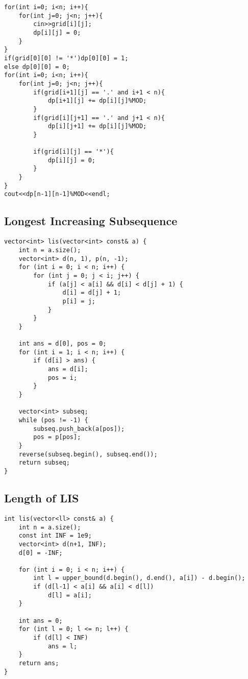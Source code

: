\documentclass[10pt]{article}
\begin{document}
\begin{multicols*}{2}
\begin{lstlisting}[style=compactcpp]
for(int i=0; i<n; i++){
    for(int j=0; j<n; j++){
        cin>>grid[i][j];
        dp[i][j] = 0;
    }
}
if(grid[0][0] != '*')dp[0][0] = 1;
else dp[0][0] = 0;
for(int i=0; i<n; i++){
    for(int j=0; j<n; j++){
        if(grid[i+1][j] == '.' and i+1 < n){
            dp[i+1][j] += dp[i][j]%MOD;
        }   
        if(grid[i][j+1] == '.' and j+1 < n){
            dp[i][j+1] += dp[i][j]%MOD;
        }

        if(grid[i][j] == '*'){
            dp[i][j] = 0;
        }
    }
}
cout<<dp[n-1][n-1]%MOD<<endl;
\end{lstlisting}

\subsection{Longest Increasing Subsequence}

\begin{lstlisting}[style=compactcpp]
vector<int> lis(vector<int> const& a) {
    int n = a.size();
    vector<int> d(n, 1), p(n, -1);
    for (int i = 0; i < n; i++) {
        for (int j = 0; j < i; j++) {
            if (a[j] < a[i] && d[i] < d[j] + 1) {
                d[i] = d[j] + 1;
                p[i] = j;
            }
        }
    }

    int ans = d[0], pos = 0;
    for (int i = 1; i < n; i++) {
        if (d[i] > ans) {
            ans = d[i];
            pos = i;
        }
    }

    vector<int> subseq;
    while (pos != -1) {
        subseq.push_back(a[pos]);
        pos = p[pos];
    }
    reverse(subseq.begin(), subseq.end());
    return subseq;
}
\end{lstlisting}

\subsection{Length of LIS}

\begin{lstlisting}[style=compactcpp]
int lis(vector<ll> const& a) {
    int n = a.size();
    const int INF = 1e9;
    vector<int> d(n+1, INF);
    d[0] = -INF;

    for (int i = 0; i < n; i++) {
        int l = upper_bound(d.begin(), d.end(), a[i]) - d.begin();
        if (d[l-1] < a[i] && a[i] < d[l])
            d[l] = a[i];
    }

    int ans = 0;
    for (int l = 0; l <= n; l++) {
        if (d[l] < INF)
            ans = l;
    }
    return ans;
}
\end{lstlisting}


\end{multicols*}
\end{document}

